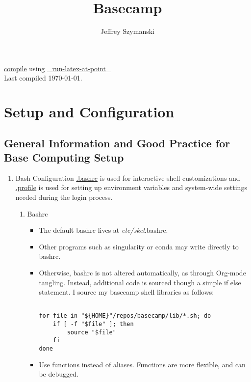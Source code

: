 \documentclass{article}
\author{Jeffrey Szymanski}
\date{}
\title{Basecamp}
\begin{document}
\maketitle
\tableofcontents

\href{(run-latex-at-point)}{compile} using \href{basecamp.org}{\_run-latex-at-point}\_\\[0pt]
\vspace{5mm}
\hfill Last compiled \today.


\section{Setup and Configuration}
\label{sec:org779932b}
\subsection{General Information and Good Practice for Base Computing Setup}
\label{sec:orgb73ad3c}
\begin{enumerate}
\item Bash Configuration
\label{sec:org7bd5047}
\href{file:///home/jeszyman/.bashrc}{.bashrc} is used for interactive shell customizations and \href{file:///home/jeszyman/.profile}{.profile} is used for setting up environment variables and system-wide settings needed during the login process.\\[0pt]
\begin{enumerate}
\item Bashrc
\label{sec:orgb00e924}
\begin{itemize}
\item The default bashrc lives at \emph{etc/skel}.bashrc.\\[0pt]
\item Other programs such as singularity or conda may write directly to bashrc.\\[0pt]
\item Otherwise, bashrc is not altered automatically, as through Org-mode tangling. Instead, additional code is sourced though a simple if else statement. I source my basecamp shell libraries as follows:\\[0pt]

\begin{verbatim}

for file in "${HOME}"/repos/basecamp/lib/*.sh; do
    if [ -f "$file" ]; then
        source "$file"
    fi
done

\end{verbatim}

\item Use functions instead of aliases. Functions are more flexible, and can be debugged.\\[0pt]
\end{itemize}
\end{enumerate}
\end{enumerate}
\end{document}
